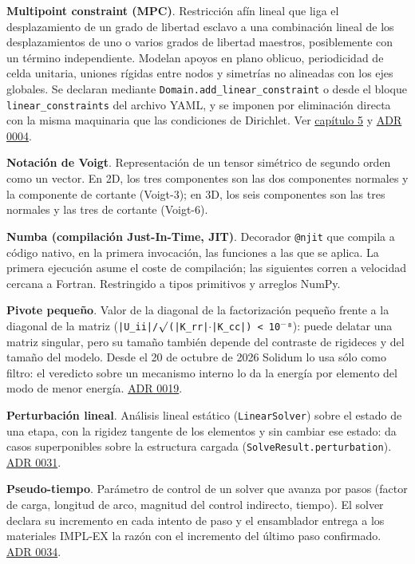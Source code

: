 \documentclass[11pt,oneside]{report}
\begin{document}
\textbf{Multipoint constraint (MPC)}. Restricción afín lineal que liga el desplazamiento de un grado de libertad esclavo a una combinación lineal de los desplazamientos de uno o varios grados de libertad maestros, posiblemente con un término independiente. Modelan apoyos en plano oblicuo, periodicidad de celda unitaria, uniones rígidas entre nodos y simetrías no alineadas con los ejes globales. Se declaran mediante \texttt{Domain.\allowbreak{}add\_\allowbreak{}linear\_\allowbreak{}constraint} o desde el bloque \texttt{linear\_\allowbreak{}constraints} del archivo YAML, y se imponen por eliminación directa con la misma maquinaria que las condiciones de Dirichlet. Ver \hyperref[cap:5]{capítulo 5} y \hyperref[adr:0004]{ADR 0004}.

\textbf{Notación de Voigt}. Representación de un tensor simétrico de segundo orden como un vector. En 2D, los tres componentes son las dos componentes normales y la componente de cortante (Voigt-3); en 3D, los seis componentes son las tres normales y las tres de cortante (Voigt-6).

\textbf{Numba (compilación Just-In-Time, JIT)}. Decorador \texttt{@njit} que compila a código nativo, en la primera invocación, las funciones a las que se aplica. La primera ejecución asume el coste de compilación; las siguientes corren a velocidad cercana a Fortran. Restringido a tipos primitivos y arreglos NumPy.

\textbf{Pivote pequeño}. Valor de la diagonal de la factorización pequeño frente a la diagonal de la matriz (\texttt{|U\_\allowbreak{}ii|/\allowbreak{}\ensuremath{\surd}(|K\_\allowbreak{}rr|\ensuremath{\cdot}|K\_\allowbreak{}cc|) \textless{} 10\ensuremath{^{-}}⁸}): puede delatar una matriz singular, pero su tamaño también depende del contraste de rigideces y del tamaño del modelo. Desde el 20 de octubre de 2026 Solidum lo usa sólo como filtro: el veredicto sobre un mecanismo interno lo da la energía por elemento del modo de menor energía. \hyperref[adr:0019]{ADR 0019}.

\textbf{Perturbación lineal}. Análisis lineal estático (\texttt{LinearSolver}) sobre el estado de una etapa, con la rigidez tangente de los elementos y sin cambiar ese estado: da casos superponibles sobre la estructura cargada (\texttt{SolveResult.\allowbreak{}perturbation}). \hyperref[adr:0031]{ADR 0031}.

\textbf{Pseudo-tiempo}. Parámetro de control de un solver que avanza por pasos (factor de carga, longitud de arco, magnitud del control indirecto, tiempo). El solver declara su incremento en cada intento de paso y el ensamblador entrega a los materiales IMPL-EX la razón con el incremento del último paso confirmado. \hyperref[adr:0034]{ADR 0034}.
\end{document}
